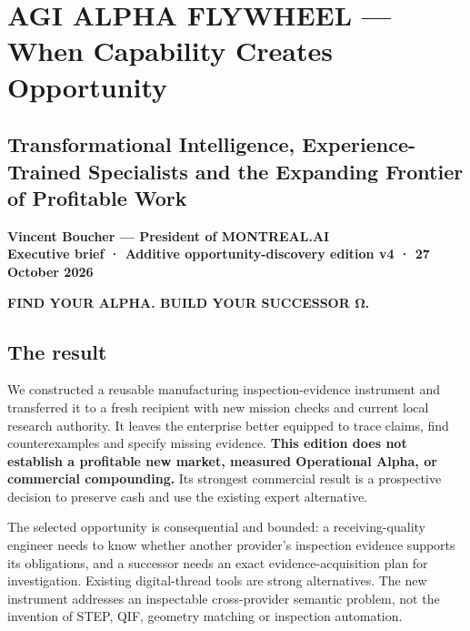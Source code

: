 \documentclass[
  10pt,
]{article}
\author{}
\date{}
\let\OriginalSection\section
\renewcommand{\section}{\needspace{5\baselineskip}\OriginalSection}
\let\OriginalSubsection\subsection
\renewcommand{\subsection}{\needspace{6\baselineskip}\OriginalSubsection}
\begin{document}
\hypertarget{agi-alpha-flywheel-when-capability-creates-opportunity}{%
\section{AGI ALPHA FLYWHEEL --- When Capability Creates
Opportunity}\label{agi-alpha-flywheel-when-capability-creates-opportunity}}

\hypertarget{transformational-intelligence-experience-trained-specialists-and-the-expanding-frontier-of-profitable-work}{%
\subsection{Transformational Intelligence, Experience-Trained
Specialists and the Expanding Frontier of Profitable
Work}\label{transformational-intelligence-experience-trained-specialists-and-the-expanding-frontier-of-profitable-work}}

\textbf{Vincent Boucher --- President of MONTREAL.AI}\\
\textbf{Executive brief · Additive opportunity-discovery edition v4 · 27
October 2026}

\textbf{FIND YOUR ALPHA. BUILD YOUR SUCCESSOR Ω.}

\hypertarget{the-result}{%
\subsection{The result}\label{the-result}}

We constructed a reusable manufacturing inspection-evidence instrument
and transferred it to a fresh recipient with new mission checks and
current local research authority. It leaves the enterprise better
equipped to trace claims, find counterexamples and specify missing
evidence. \textbf{This edition does not establish a profitable new
market, measured Operational Alpha, or commercial compounding.} Its
strongest commercial result is a prospective decision to preserve cash
and use the existing expert alternative.

The selected opportunity is consequential and bounded: a
receiving-quality engineer needs to know whether another provider's
inspection evidence supports its obligations, and a successor needs an
exact evidence-acquisition plan for investigation. Existing
digital-thread tools are strong alternatives. The new instrument
addresses an inspectable cross-provider semantic problem, not the
invention of STEP, QIF, geometry matching or inspection automation.
\end{document}
